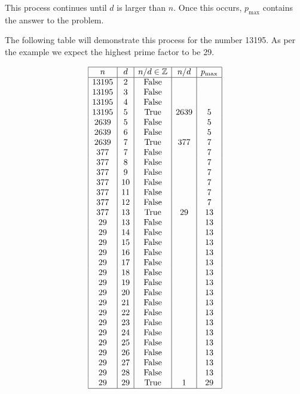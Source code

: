\documentclass{article}
\begin{document}
This process continues until \(d\) is larger than \(n\). Once this occurs, \(p_\text{max}\) contains the answer to the problem.

The following table will demonstrate this process for the number 13195. As per the example we expect the highest prime factor to be 29.

\[\begin{array}{|c|c|c|c|c|}
    \hline
    n & d & n/d \in \mathbb{Z} & n/d & p_\text{max} \\
    \hline
    13195 & 2 & \text{False} & & \\
    13195 & 3 & \text{False} & & \\
    13195 & 4 & \text{False} & & \\
    13195 & 5 & \text{True} & 2639 & 5 \\
    2639 & 5 & \text{False} & & 5 \\
    2639 & 6 & \text{False} & & 5 \\
    2639 & 7 & \text{True} & 377 & 7 \\
    377 & 7 & \text{False} & & 7 \\
    377 & 8 & \text{False} & & 7 \\
    377 & 9 & \text{False} & & 7 \\
    377 & 10 & \text{False} & & 7 \\
    377 & 11 & \text{False} & & 7 \\
    377 & 12 & \text{False} & & 7 \\
    377 & 13 & \text{True} & 29 & 13 \\
    29 & 13 & \text{False} & & 13 \\
    29 & 14 & \text{False} & & 13 \\
    29 & 15 & \text{False} & & 13 \\
    29 & 16 & \text{False} & & 13 \\
    29 & 17 & \text{False} & & 13 \\
    29 & 18 & \text{False} & & 13 \\
    29 & 19 & \text{False} & & 13 \\
    29 & 20 & \text{False} & & 13 \\
    29 & 21 & \text{False} & & 13 \\
    29 & 22 & \text{False} & & 13 \\
    29 & 23 & \text{False} & & 13 \\
    29 & 24 & \text{False} & & 13 \\
    29 & 25 & \text{False} & & 13 \\
    29 & 26 & \text{False} & & 13 \\
    29 & 27 & \text{False} & & 13 \\
    29 & 28 & \text{False} & & 13 \\
    29 & 29 & \text{True} & 1 & 29 \\
    \hline
\end{array}\]
\end{document}
